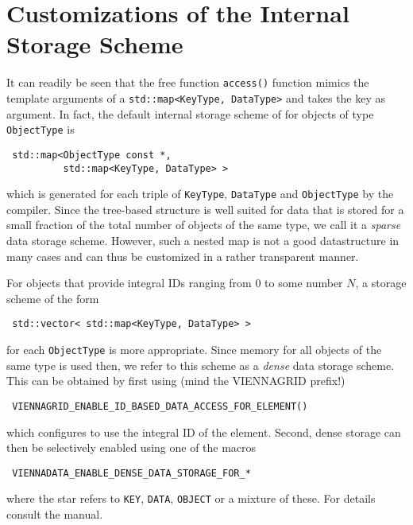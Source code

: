 \section{Customizations of the Internal Storage Scheme}
It can readily be seen that the free function \lstinline|access()| function mimics the template arguments of a \lstinline|std::map<KeyType, DataType>| and takes the key as argument. In fact, the default internal storage scheme of {\ViennaData} for objects of type \lstinline|ObjectType| is 
\begin{lstlisting}
 std::map<ObjectType const *,
          std::map<KeyType, DataType> >
\end{lstlisting}
which is generated for each triple of \lstinline|KeyType|, \lstinline|DataType| and \lstinline|ObjectType| by the compiler.
Since the tree-based structure is well suited for data that is stored for a small fraction of the total number of objects of the same type, we call it a \emph{sparse} data storage scheme. However, such a nested map is not a good datastructure in many cases and can thus be customized in a rather transparent manner.

For objects that provide integral IDs ranging from $0$ to some number $N$, a storage scheme of the form
\begin{lstlisting}
 std::vector< std::map<KeyType, DataType> >
\end{lstlisting}
for each \lstinline|ObjectType| is more appropriate. Since memory for all objects of the same type is used then, we refer to this scheme as a \emph{dense} data storage scheme. This can be obtained by first using (mind the VIENNAGRID prefix!)
\begin{lstlisting}
 VIENNAGRID_ENABLE_ID_BASED_DATA_ACCESS_FOR_ELEMENT()
\end{lstlisting}
which configures {\ViennaData} to use the integral ID of the element. 
Second, dense storage can then be selectively enabled using one of the macros
\begin{lstlisting}
 VIENNADATA_ENABLE_DENSE_DATA_STORAGE_FOR_*
\end{lstlisting}
where the star refers to \lstinline|KEY|, \lstinline|DATA|, \lstinline|OBJECT| or a mixture of these. For details consult the {\ViennaData} manual.


